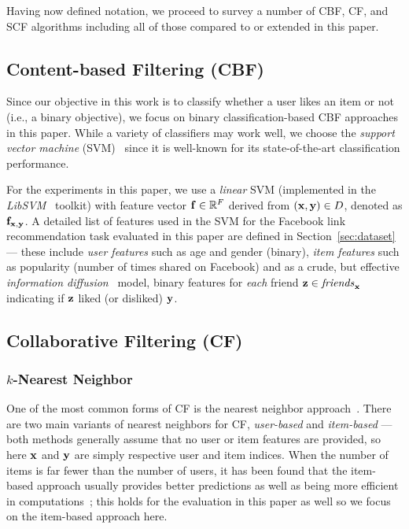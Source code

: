 Having now defined notation, we proceed to survey a number of 
CBF, CF, and SCF algorithms including all of those 
compared to or extended in this paper.

\subsection{Content-based Filtering (CBF)}

Since our objective in this work is to classify whether a user likes
an item or not (i.e., a binary objective), we focus on binary
classification-based CBF approaches in this paper.  While a variety of
classifiers may work well, we choose the
\emph{support vector machine} (SVM)~\cite{svm} since it is
well-known for its state-of-the-art classification performance.

For the experiments in this paper, we use a \emph{linear} SVM
(implemented in the \emph{LibSVM}~\cite{libsvm} toolkit) with feature
vector $\mathbf{f} \in \mathbb{R}^F$ derived from $(\mathbf{x},\mathbf{y}) \in D$, denoted as
$\mathbf{f}_{\mathbf{x},\mathbf{y}}$.  A detailed list of features used in the SVM for the
Facebook link recommendation task evaluated in this paper are defined
in Section~\ref{sec:dataset} --- these include \emph{user features} such as
age and gender (binary), \emph{item features} such as popularity (number of
times shared on Facebook) and as a crude, but effective
\emph{information diffusion}~\cite{inf_diffusion} model, binary features
for \emph{each} friend $\mathbf{z} \in \mathit{friends}_{\mathbf{x}}$ indicating if $\mathbf{z}$
liked (or disliked) $\mathbf{y}$.

\subsection{Collaborative Filtering (CF)}

\subsubsection{$k$-Nearest Neighbor}
\label{sec:nn}

One of the most common forms of CF is the nearest neighbor
approach~\cite{bellkor}. 
There are two main variants of nearest neighbors for
CF, \emph{user-based} and \emph{item-based} --- both
methods generally assume that no user or item features are provided,
so here $\mathbf{x}$ and $\mathbf{y}$ are simply respective user and item indices.
When the
number of items is far fewer than the number of users, it has been
found that the item-based approach usually provides better predictions
as well as being more efficient in computations~\cite{bellkor};
this holds for the evaluation in this paper as well so 
we focus on the item-based approach here.

